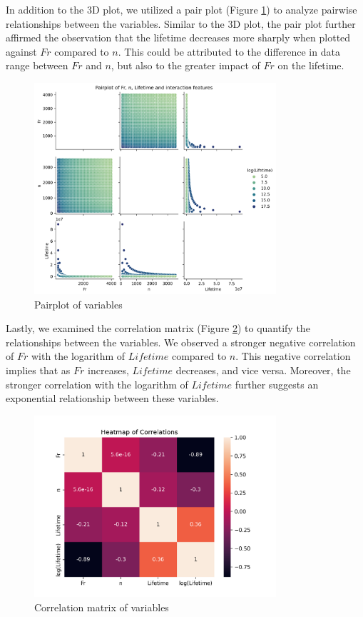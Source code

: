 In addition to the 3D plot, we utilized a pair plot (Figure \ref{fig:bearings-pairplot}) to analyze pairwise relationships between the variables. Similar to the 3D plot, the pair plot further affirmed the observation that the lifetime decreases more sharply when plotted against \(Fr\) compared to \(n\). This could be attributed to the difference in data range between \(Fr\) and \(n\), but also to the greater impact of \(Fr\) on the lifetime.

\begin{figure}[h]
    \centering
    \includegraphics[width=0.8\textwidth]{assets/bearings-eda/pairplot.png}
    \caption{Pairplot of variables}
    \label{fig:bearings-pairplot}
\end{figure}

Lastly, we examined the correlation matrix (Figure \ref{fig:bearings-corrmat}) to quantify the relationships between the variables. We observed a stronger negative correlation of \(Fr\) with the logarithm of \(Lifetime\) compared to \(n\). This negative correlation implies that as \(Fr\) increases, \(Lifetime\) decreases, and vice versa. Moreover, the stronger correlation with the logarithm of \(Lifetime\) further suggests an exponential relationship between these variables.

\begin{figure}[h]
    \centering
    \includegraphics[width=0.8\textwidth]{assets/bearings-eda/correlation-matrix.png}
    \caption{Correlation matrix of variables}
    \label{fig:bearings-corrmat}
\end{figure}

